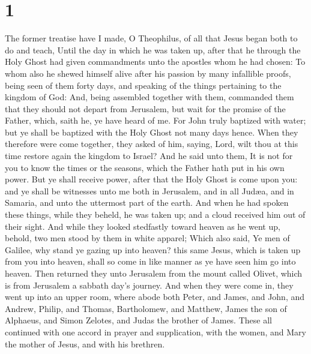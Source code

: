 \hypertarget{section}{%
\section{1}\label{section}}

 The former treatise have I made, O Theophilus, of all
that Jesus began both to do and teach,  Until the day in
which he was taken up, after that he through the Holy Ghost had given
commandments unto the apostles whom he had chosen:  To
whom also he shewed himself alive after his passion by many infallible
proofs, being seen of them forty days, and speaking of the things
pertaining to the kingdom of God:  And, being assembled
together with them, commanded them that they should not depart from
Jerusalem, but wait for the promise of the Father, which, saith he, ye
have heard of me.  For John truly baptized with water; but
ye shall be baptized with the Holy Ghost not many days hence.
 When they therefore were come together, they asked of
him, saying, Lord, wilt thou at this time restore again the kingdom to
Israel?  And he said unto them, It is not for you to know
the times or the seasons, which the Father hath put in his own power.
 But ye shall receive power, after that the Holy Ghost is
come upon you: and ye shall be witnesses unto me both in Jerusalem, and
in all Judæa, and in Samaria, and unto the uttermost part of the earth.
 And when he had spoken these things, while they beheld,
he was taken up; and a cloud received him out of their sight.
 And while they looked stedfastly toward heaven as he
went up, behold, two men stood by them in white apparel; 
Which also said, Ye men of Galilee, why stand ye gazing up into heaven?
this same Jesus, which is taken up from you into heaven, shall so come
in like manner as ye have seen him go into heaven.  Then
returned they unto Jerusalem from the mount called Olivet, which is from
Jerusalem a sabbath day's journey.  And when they were
come in, they went up into an upper room, where abode both Peter, and
James, and John, and Andrew, Philip, and Thomas, Bartholomew, and
Matthew, James the son of Alphaeus, and Simon Zelotes, and Judas the
brother of James.  These all continued with one accord in
prayer and supplication, with the women, and Mary the mother of Jesus,
and with his brethren.


